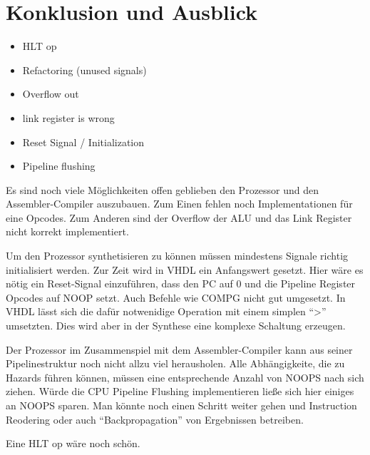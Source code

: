 \documentclass[paper=a4,fontsize=12pt,twocolumn]{scrreprt}
\begin{document}
\chapter{Konklusion und Ausblick}
\begin{itemize}
    \item HLT op
    \item Refactoring (unused signals)
    \item Overflow out
    \item link register is wrong
    \item Reset Signal / Initialization
    \item Pipeline flushing
\end{itemize}


Es sind noch viele Möglichkeiten offen geblieben den Prozessor und den Assembler-Compiler auszubauen.
Zum Einen fehlen noch Implementationen für eine Opcodes.
Zum Anderen sind der Overflow der ALU und das Link Register nicht korrekt implementiert.

Um den Prozessor synthetisieren zu können müssen mindestens Signale richtig initialisiert werden.
Zur Zeit wird in VHDL ein Anfangswert gesetzt.
Hier wäre es nötig ein Reset-Signal einzuführen, dass den PC auf 0 und die Pipeline Register Opcodes auf NOOP setzt.
Auch Befehle wie COMPG nicht gut umgesetzt.
In VHDL lässt sich die dafür notwenidige Operation mit einem simplen \enquote{>} umsetzten.
Dies wird aber in der Synthese eine komplexe Schaltung erzeugen.

Der Prozessor im Zusammenspiel mit dem Assembler-Compiler kann aus seiner Pipelinestruktur noch nicht allzu viel herausholen.
Alle Abhängigkeite, die zu Hazards führen können, müssen eine entsprechende Anzahl von NOOPS nach sich ziehen.
Würde die CPU Pipeline Flushing implementieren ließe sich hier einiges an NOOPS sparen.
Man könnte noch einen Schritt weiter gehen und Instruction Reodering oder auch \enquote{Backpropagation} von Ergebnissen betreiben.

Eine HLT op wäre noch schön.

\kant[10-14]
\end{document}
